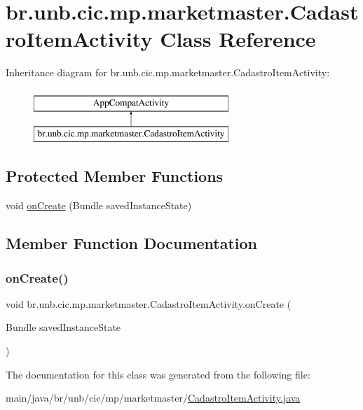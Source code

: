 \hypertarget{classbr_1_1unb_1_1cic_1_1mp_1_1marketmaster_1_1CadastroItemActivity}{}\section{br.\+unb.\+cic.\+mp.\+marketmaster.\+Cadastro\+Item\+Activity Class Reference}
\label{classbr_1_1unb_1_1cic_1_1mp_1_1marketmaster_1_1CadastroItemActivity}
Inheritance diagram for br.\+unb.\+cic.\+mp.\+marketmaster.\+Cadastro\+Item\+Activity\+:\begin{figure}[H]
\begin{center}
\leavevmode
\includegraphics[height=2.000000cm]{classbr_1_1unb_1_1cic_1_1mp_1_1marketmaster_1_1CadastroItemActivity}
\end{center}
\end{figure}
\subsection*{Protected Member Functions}
\begin{DoxyCompactItemize}
\item 
void \mbox{\hyperlink{classbr_1_1unb_1_1cic_1_1mp_1_1marketmaster_1_1CadastroItemActivity_a5349ce9e15fea3faf7a4cce9758dd167}{on\+Create}} (Bundle saved\+Instance\+State)
\end{DoxyCompactItemize}


\subsection{Member Function Documentation}
\mbox{\label{classbr_1_1unb_1_1cic_1_1mp_1_1marketmaster_1_1CadastroItemActivity_a5349ce9e15fea3faf7a4cce9758dd167}} 
\subsubsection{\texorpdfstring{on\+Create()}{onCreate()}}
{\footnotesize\ttfamily void br.\+unb.\+cic.\+mp.\+marketmaster.\+Cadastro\+Item\+Activity.\+on\+Create (\begin{DoxyParamCaption}\item[{Bundle}]{saved\+Instance\+State }\end{DoxyParamCaption})\hspace{0.3cm}{\ttfamily [protected]}}



The documentation for this class was generated from the following file\+:\begin{DoxyCompactItemize}
\item 
main/java/br/unb/cic/mp/marketmaster/\mbox{\hyperlink{CadastroItemActivity_8java}{Cadastro\+Item\+Activity.\+java}}\end{DoxyCompactItemize}
